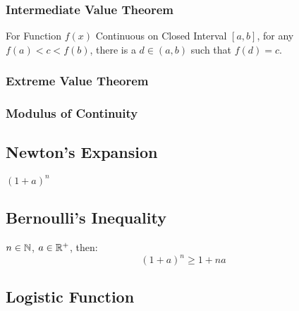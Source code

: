 \subsubsection{Intermediate Value Theorem}
\label{sec:intermediate_value}

For Function $f(x)$ Continuous on Closed Interval $[a,b]$, for any
$f(a) < c < f(b)$, there is a $d \in (a,b)$ such that $f(d) = c$.



\subsubsection{Extreme Value Theorem}\label{sec:extreme_value}

\subsubsection{Modulus of Continuity}\label{sec:continuity_modulus}



\subsection{Newton's Expansion}\label{sec:newtons_expansion}


$(1 + a)^n$ %



\subsection{Bernoulli's Inequality}\label{sec:bernoullis_inequality}

$n \in \mathbb{N}$, $a \in \mathbb{R}^+$, then:
\[
  (1 + a)^n \geq 1 + n a
\]


\subsection{Logistic Function}\label{sec:logistic_function}


